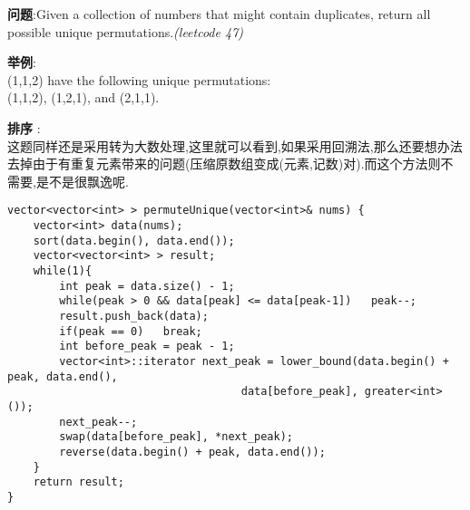    
\begin{description}
    \item{\textbf{问题}}:Given a collection of numbers that might contain duplicates, return all possible unique permutations.\textit{(leetcode 47)}
	\item{\textbf{举例}}:\\
(1,1,2) have the following unique permutations:\\
(1,1,2), (1,2,1), and (2,1,1).
    \item{\textbf{排序}} : 
    \\这题同样还是采用转为大数处理,这里就可以看到,如果采用回溯法,那么还要想办法去掉由于有重复元素带来的问题(压缩原数组变成(元素,记数)对).而这个方法则不需要,是不是很飘逸呢.
    \begin{lstlisting}
vector<vector<int> > permuteUnique(vector<int>& nums) {
	vector<int> data(nums);
	sort(data.begin(), data.end());
	vector<vector<int> > result;
	while(1){
		int peak = data.size() - 1;
		while(peak > 0 && data[peak] <= data[peak-1])	peak--;
		result.push_back(data);
		if(peak == 0)	break;
		int before_peak = peak - 1;
		vector<int>::iterator next_peak = lower_bound(data.begin() + peak, data.end(), 
									data[before_peak], greater<int>());
		next_peak--;
		swap(data[before_peak], *next_peak);
		reverse(data.begin() + peak, data.end());
	}
	return result;
}
    \end{lstlisting}
\end{description}
